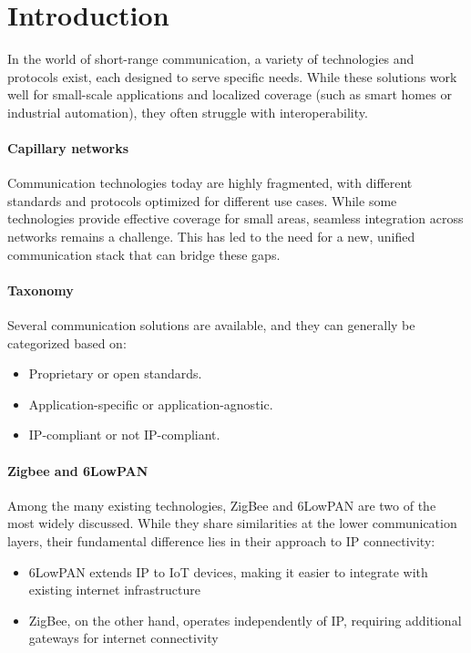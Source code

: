 \section{Introduction}

In the world of short-range communication, a variety of technologies and protocols exist, each designed to serve specific needs. 
While these solutions work well for small-scale applications and localized coverage (such as smart homes or industrial automation), they often struggle with interoperability.

\paragraph*{Capillary networks}
Communication technologies today are highly fragmented, with different standards and protocols optimized for different use cases. 
While some technologies provide effective coverage for small areas, seamless integration across networks remains a challenge. 
This has led to the need for a new, unified communication stack that can bridge these gaps.

\paragraph*{Taxonomy}
Several communication solutions are available, and they can generally be categorized based on:
\begin{itemize}
    \item Proprietary or open standards. 
    \item Application-specific or application-agnostic. 
    \item IP-compliant or not IP-compliant. 
\end{itemize}

\paragraph*{Zigbee and 6LowPAN}
Among the many existing technologies, ZigBee and 6LowPAN are two of the most widely discussed.
While they share similarities at the lower communication layers, their fundamental difference lies in their approach to IP connectivity:
\begin{itemize}
    \item 6LowPAN extends IP to IoT devices, making it easier to integrate with existing internet infrastructure
    \item ZigBee, on the other hand, operates independently of IP, requiring additional gateways for internet connectivity
\end{itemize}